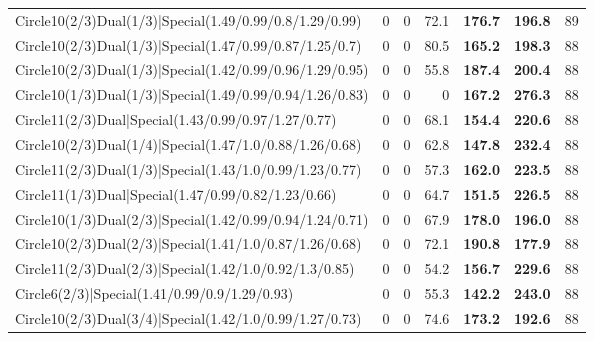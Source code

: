 \begin{tabular}{lrrrllr}
 Circle10(2/3)Dual(1/3)|Special(1.49/0.99/0.8/1.29/0.99)        &          0   &            0   &          72.1 & \textbf{176.7} & \textbf{196.8} &           89 \\
 Circle10(2/3)Dual(1/3)|Special(1.47/0.99/0.87/1.25/0.7)        &          0   &            0   &          80.5 & \textbf{165.2} & \textbf{198.3} &           88 \\
 Circle10(2/3)Dual(1/3)|Special(1.42/0.99/0.96/1.29/0.95)       &          0   &            0   &          55.8 & \textbf{187.4} & \textbf{200.4} &           88 \\
 Circle10(1/3)Dual(1/3)|Special(1.49/0.99/0.94/1.26/0.83)       &          0   &            0   &           0   & \textbf{167.2} & \textbf{276.3} &           88 \\
 Circle11(2/3)Dual|Special(1.43/0.99/0.97/1.27/0.77)            &          0   &            0   &          68.1 & \textbf{154.4} & \textbf{220.6} &           88 \\
 Circle10(2/3)Dual(1/4)|Special(1.47/1.0/0.88/1.26/0.68)        &          0   &            0   &          62.8 & \textbf{147.8} & \textbf{232.4} &           88 \\
 Circle11(2/3)Dual(1/3)|Special(1.43/1.0/0.99/1.23/0.77)        &          0   &            0   &          57.3 & \textbf{162.0} & \textbf{223.5} &           88 \\
 Circle11(1/3)Dual|Special(1.47/0.99/0.82/1.23/0.66)            &          0   &            0   &          64.7 & \textbf{151.5} & \textbf{226.5} &           88 \\
 Circle10(1/3)Dual(2/3)|Special(1.42/0.99/0.94/1.24/0.71)       &          0   &            0   &          67.9 & \textbf{178.0} & \textbf{196.0} &           88 \\
 Circle10(2/3)Dual(2/3)|Special(1.41/1.0/0.87/1.26/0.68)        &          0   &            0   &          72.1 & \textbf{190.8} & \textbf{177.9} &           88 \\
 Circle11(2/3)Dual(2/3)|Special(1.42/1.0/0.92/1.3/0.85)         &          0   &            0   &          54.2 & \textbf{156.7} & \textbf{229.6} &           88 \\
 Circle6(2/3)|Special(1.41/0.99/0.9/1.29/0.93)                  &          0   &            0   &          55.3 & \textbf{142.2} & \textbf{243.0} &           88 \\
 Circle10(2/3)Dual(3/4)|Special(1.42/1.0/0.99/1.27/0.73)        &          0   &            0   &          74.6 & \textbf{173.2} & \textbf{192.6} &           88 \\

\end{tabular}
